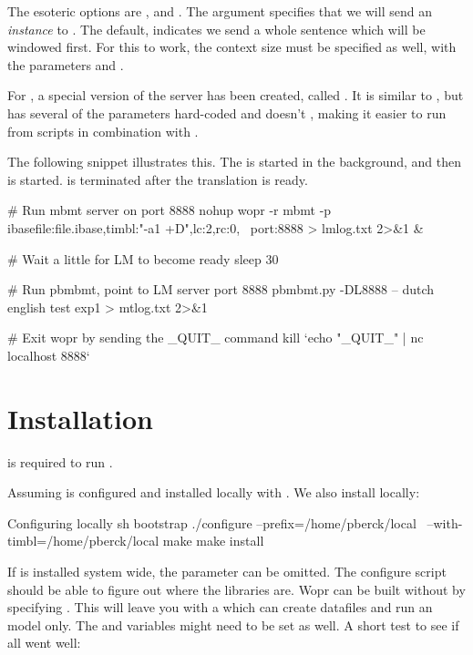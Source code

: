 \documentclass[a4paper,10pt,twoside]{report}
\begin{document}
The esoteric options are , and . The 
argument specifies that we will send an \emph{instance} to
\wopr{}. The default,  indicates we send a whole sentence
which will be windowed first. For this to work, the context size must
be specified as well, with the parameters  and .

For \pbmbmt{}, a special version of the server has been created,
called . It is similar to , but has several of
the parameters hard-coded and doesn't , making it easier to
run from scripts in combination with \pbmbmt{}.

The following snippet illustrates this. The \wopr{} \lm{} is started
in the background, and then \pbmbmt{} is started. \Wopr{} is
terminated after the translation is ready.

\begin{bash}{}
# Run mbmt server on port 8888
nohup wopr -r mbmt -p ibasefile:file.ibase,timbl:"-a1 +D",lc:2,rc:0, \
    port:8888 > lmlog.txt 2>&1 &

# Wait a little for LM to become ready
sleep 30

# Run pbmbmt, point to LM server port 8888
pbmbmt.py -DL8888 -- dutch english test exp1 > mtlog.txt 2>&1

# Exit wopr by sending the _QUIT_ command 
kill `echo "_QUIT_" | nc localhost 8888`
\end{bash}

\chapter{Installation}

\Timbl{} is required to run \wopr{}.

Assuming \Timbl{} is configured and installed locally with
. We also install \wopr{} locally:

\begin{bash}{Configuring \wopr{} locally}
sh bootstrap
./configure --prefix=/home/pberck/local \
            --with-timbl=/home/pberck/local
make
make install
\end{bash}

If \Timbl{} is installed system wide, the  parameter
can be omitted. The configure script should be able to figure out
where the libraries are. Wopr can be built without \Timbl{} by specifying
\cmp{--without-timbl}. This will leave you with a \wopr{} which can
create datafiles and run an \ngram{} model only.
The \cmp{LD\_LIBRARY\_PATH} and \cmp{PATH} variables might need to be
set as well. A short test to see if all went well:
\end{document}
